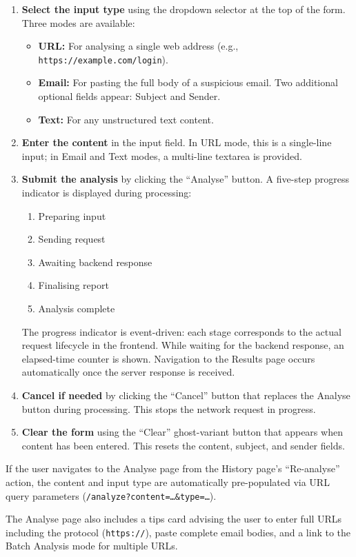 \begin{enumerate}
\item \textbf{Select the input type} using the dropdown selector at the top of the form. Three modes are available:
\begin{itemize}
\item \textbf{URL:} For analysing a single web address (e.g., \texttt{https://example.com/login}).
\item \textbf{Email:} For pasting the full body of a suspicious email. Two additional optional fields appear: Subject and Sender.
\item \textbf{Text:} For any unstructured text content.
\end{itemize}
\item \textbf{Enter the content} in the input field. In URL mode, this is a single-line input; in Email and Text modes, a multi-line textarea is provided.
\item \textbf{Submit the analysis} by clicking the ``Analyse'' button. A five-step progress indicator is displayed during processing:
\begin{enumerate}
\item Preparing input
\item Sending request
\item Awaiting backend response
\item Finalising report
\item Analysis complete
\end{enumerate}
The progress indicator is event-driven: each stage corresponds to the actual request lifecycle in the frontend. While waiting for the backend response, an elapsed-time counter is shown. Navigation to the Results page occurs automatically once the server response is received.
\item \textbf{Cancel if needed} by clicking the ``Cancel'' button that replaces the Analyse button during processing. This stops the network request in progress.
\item \textbf{Clear the form} using the ``Clear'' ghost-variant button that appears when content has been entered. This resets the content, subject, and sender fields.
\end{enumerate}

If the user navigates to the Analyse page from the History page's ``Re-analyse'' action, the content and input type are automatically pre-populated via URL query parameters (\texttt{/analyze?content=\ldots\&type=\ldots}).

The Analyse page also includes a tips card advising the user to enter full URLs including the protocol (\texttt{https://}), paste complete email bodies, and a link to the Batch Analysis mode for multiple URLs.

